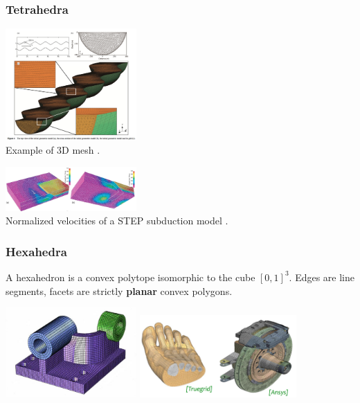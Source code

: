 \Literature \cite{musd15}\cite{vemm09}






\subsubsection{Tetrahedra}

\begin{center}
\includegraphics[width=5cm]{images/meshes/glacier}\\
{\captionfont Example of 3D mesh \cite{yash15}.}
\end{center}

\begin{center}
\includegraphics[width=5cm]{images/meshes/gowo05}\\
{\captionfont Normalized velocities of a STEP subduction model \cite{gowo05}.}
\end{center}


\subsubsection{Hexahedra}

A hexahedron is a convex polytope isomorphic to the cube $[0,1]^3$.
Edges are line segments, facets are strictly {\bf planar} convex polygons.

\begin{center}
\includegraphics[width=5cm]{images/meshes/hexa.jpg}
\includegraphics[width=6cm]{images/meshes/hexa2}
\end{center}

